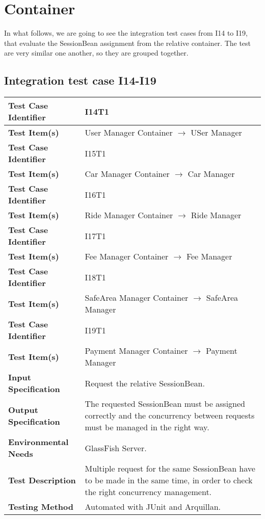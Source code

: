 \section{Container}

In what follows, we are going to see the integration test cases from I14 to I19, that evaluate the SessionBean assignment from the relative container. The test are very similar one another, so they are grouped together.

\subsection{Integration test case I14-I19}

\begin{tabular}{l p{}}
    \hline
    \textbf{Test Case Identifier} & I14T1\\
    \hline
    \textbf{Test Item(s)} & User Manager Container $\rightarrow$ USer Manager \\
    \hline
    \hline
    \textbf{Test Case Identifier} & I15T1\\
    \hline
    \textbf{Test Item(s)} & Car Manager Container $\rightarrow$ Car Manager \\
    \hline
    \hline
    \textbf{Test Case Identifier} & I16T1\\
    \hline
    \textbf{Test Item(s)} & Ride Manager Container $\rightarrow$ Ride Manager \\
    \hline
    \hline
    \textbf{Test Case Identifier} & I17T1\\
    \hline
    \textbf{Test Item(s)} & Fee Manager Container $\rightarrow$ Fee Manager \\
    \hline
    \hline
    \textbf{Test Case Identifier} & I18T1\\
    \hline
    \textbf{Test Item(s)} & SafeArea Manager Container $\rightarrow$ SafeArea Manager \\
    \hline
    \hline
    \textbf{Test Case Identifier} & I19T1\\
    \hline
    \textbf{Test Item(s)} & Payment Manager Container $\rightarrow$ Payment Manager \\
    \hline
    \hline
    \textbf{Input Specification} & Request the relative SessionBean. \\
    \hline
    \textbf{Output Specification} & The requested SessionBean must be assigned correctly and the concurrency between requests must be managed in the right way. \\
    \hline
    \textbf{Environmental Needs} & GlassFish Server.\\
    \hline
    \textbf{Test Description} & Multiple request for the same SessionBean have to be made in the same time, in order to check the right concurrency management.\\
    \hline
    \textbf{Testing Method} & Automated with JUnit and Arquillan. \\
    \hline
\end{tabular}

